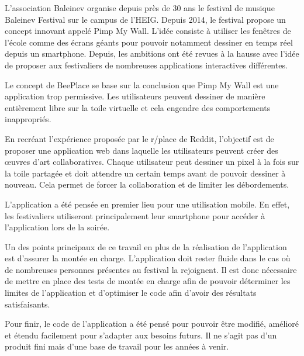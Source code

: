 L'association Baleinev organise depuis près de 30 ans le festival de musique Baleinev Festival sur le campus de l'HEIG. Depuis 2014, le festival propose un concept innovant appelé Pimp My Wall. L'idée consiste à utiliser les fenêtres de l'école comme des écrans géants pour pouvoir notamment dessiner en temps réel depuis un smartphone. Depuis, les ambitions ont été revues à la hausse avec l'idée de proposer aux festivaliers de nombreuses applications interactives différentes.

Le concept de BeePlace se base sur la conclusion que Pimp My Wall est une application trop permissive. Les utilisateurs peuvent dessiner de manière entièrement libre sur la toile virtuelle et cela engendre des comportements inappropriés.

En recréant l'expérience proposée par le r/place de Reddit, l'objectif est de proposer une application web dans laquelle les utilisateurs peuvent créer des œuvres d'art collaboratives. Chaque utilisateur peut dessiner un pixel à la fois sur la toile partagée et doit attendre un certain temps avant de pouvoir dessiner à nouveau. Cela permet de forcer la collaboration et de limiter les débordements.

L'application a été pensée en premier lieu pour une utilisation mobile. En effet, les festivaliers utiliseront principalement leur smartphone pour accéder à l'application lors de la soirée.

Un des points principaux de ce travail en plus de la réalisation de l'application est d'assurer la montée en charge. L'application doit rester fluide dans le cas où de nombreuses personnes présentes au festival la rejoignent. Il est donc nécessaire de mettre en place des tests de montée en charge afin de pouvoir déterminer les limites de l'application et d'optimiser le code afin d'avoir des résultats satisfaisants.

Pour finir, le code de l'application a été pensé pour pouvoir être modifié, amélioré et étendu facilement pour s'adapter aux besoins futurs. Il ne s'agit pas d'un produit fini mais d'une base de travail pour les années à venir.
